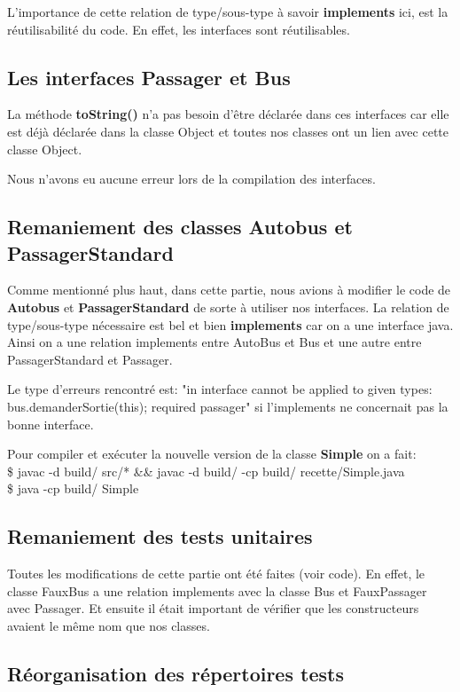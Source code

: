 \documentclass[a4paper,11pt]{article}
\begin{document}
L'importance de cette relation de type/sous-type à savoir \textbf{implements} ici, est la réutilisabilité du code. En effet, les interfaces sont réutilisables.

\subsection{Les interfaces Passager et Bus}

La méthode \textbf{toString()} n'a pas besoin d'être déclarée dans ces interfaces car elle est déjà déclarée dans la classe Object et toutes nos classes ont
un lien avec cette classe Object.

Nous n'avons eu aucune erreur lors de la compilation des interfaces.

\subsection{Remaniement des classes Autobus et PassagerStandard}

Comme mentionné plus haut, dans cette partie, nous avions à modifier le code de \textbf{Autobus} et \textbf{PassagerStandard} de sorte à utiliser nos interfaces.
La relation de type/sous-type nécessaire est bel et bien \textbf{implements} car on a une interface java. Ainsi on a une relation implements entre AutoBus et Bus
et une autre entre PassagerStandard et Passager.

Le type d'erreurs rencontré est: "in interface cannot be applied to given types: bus.demanderSortie(this); required passager" si l'implements ne concernait pas la
bonne interface.

Pour compiler et exécuter la nouvelle version de la classe \textbf{Simple} on a fait: \\
\$ javac -d build/ src/* \&\& javac -d build/ -cp build/ recette/Simple.java \\
\$ java -cp build/ Simple 

\subsection{Remaniement des tests unitaires}

Toutes les modifications de cette partie ont été faites (voir code). En effet, le classe FauxBus a une relation implements avec la classe Bus et FauxPassager avec 
Passager. Et ensuite il était important de vérifier que les constructeurs avaient le même nom que nos classes.

\subsection{Réorganisation des répertoires tests}
\end{document}

